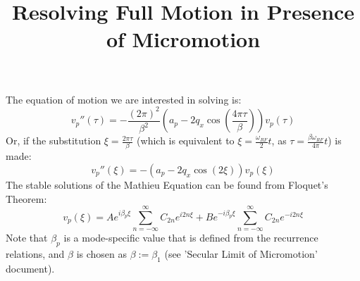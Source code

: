\documentclass{article}
\title{Resolving Full Motion in Presence of Micromotion}
\begin{document}
\maketitle

\noindent The equation of motion we are interested in solving is:
\begin{equation}
v_p''(\tau) = - \frac{(2 \pi)^2}{\beta^2} \left( a_p - 2 q_x \cos \left( \frac{4 \pi \tau}{\beta} \right) \right) v_p (\tau)	
\label{eq:mathieu}
\end{equation}
Or, if the substitution $\xi = \frac{2 \pi \tau}{\beta}$ (which is equivalent to $\xi = \frac{\omega_{RF}}{2} t$, as $\tau = \frac{\beta \omega_{RF}}{4 \pi} t$) is made:
\begin{equation}
v_p''(\xi)	= - \left( a_p - 2 q_x \cos \left( 2 \xi \right) \right) v_p (\xi)
\label{eq:mathieusimple}
\end{equation}
The stable solutions of the Mathieu Equation can be found from Floquet's Theorem:
\begin{equation}
	v_p (\xi) = A e^{i \beta_p \xi} \sum_{n = - \infty}^{\infty} C_{2n} e^{i 2 n \xi} + B e^{- i \beta_p \xi} \sum_{n = - \infty}^{\infty} C_{2n} e^{- i 2 n \xi}
	\label{eq:motion}
\end{equation}
Note that $\beta_p$ is a mode-specific value that is defined from the recurrence relations, and $\beta$ is chosen as $\beta := \beta_1$ (see 'Secular Limit of Micromotion' document). 
\end{document}
